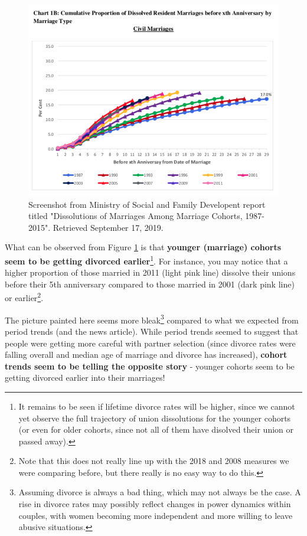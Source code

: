 \documentclass[
  openany]{book}
\begin{document}
\begin{figure}

{\centering \includegraphics[width=0.8\linewidth]{images/apc/report_fig2} 

}

\caption{Screenshot from Ministry of Social and Family Developent report titled "Dissolutions of Marriages Among Marriage Cohorts, 1987-2015". Retrieved September 17, 2019.}\label{fig:apc-reportmsf}
\end{figure}

What can be observed from Figure \ref{fig:apc-reportmsf} is that \textbf{younger (marriage) cohorts seem to be getting divorced earlier}\footnote{It remains to be seen if lifetime divorce rates will be higher, since we cannot yet observe the full trajectory of union dissolutions for the younger cohorts (or even for older cohorts, since not all of them have disolved their union or passed away).}. For instance, you may notice that a higher proportion of those married in 2011 (light pink line) dissolve their unions before their 5th anniversary compared to those married in 2001 (dark pink line) or earlier\footnote{Note that this does not really line up with the 2018 and 2008 measures we were comparing before, but there really is no easy way to do this.}.

The picture painted here seems more bleak\footnote{Assuming divorce is always a bad thing, which may not always be the case. A rise in divorce rates may possibly reflect changes in power dynamics within couples, with women becoming more independent and more willing to leave abusive situations.} compared to what we expected from period trends (and the news article). While period trends seemed to suggest that people were getting more careful with partner selection (since divorce rates were falling overall and median age of marriage and divorce has increased), \textbf{cohort trends seem to be telling the opposite story} - younger cohorts seem to be getting divorced earlier into their marriages!
\end{document}
